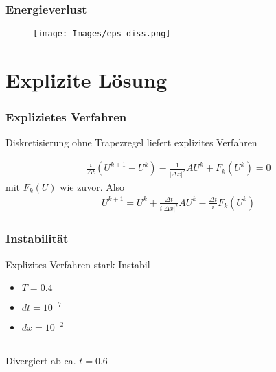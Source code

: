 \documentclass{beamer}
\begin{document}
\begin{frame}
    \frametitle{Energieverlust}

    \begin{figure}
        \begin{center}
            \texttt{[image: Images/eps-diss.png]}
        \end{center}
    \end{figure}

\end{frame}

\section{Explizite Lösung}

\begin{frame}
    \frametitle{Explizietes Verfahren}

    Diskretisierung ohne Trapezregel liefert explizites Verfahren

    \begin{align*}
        \frac{i}{\Delta t} (U^{k+1}-U^k)-\frac{1}{|\Delta x|^2}AU^k+F_k(U^k)=0
    \end{align*}
    mit $F_k(U)$ wie zuvor. Also
    \begin{align*}
        U^{k+1}=U^k+\frac{\Delta t}{i|\Delta x|^2}AU^k-\frac{\Delta t}{i}F_k(U^k)
    \end{align*}


\end{frame}

\begin{frame}
    \frametitle{Instabilität}

    Explizites Verfahren stark Instabil
    \begin{itemize}
        \item $T = 0.4$
        \item $dt = 10^{-7}$
        \item $dx = 10^{-2}$
    \end{itemize}
    \ \\
    Divergiert ab ca. $t=0.6$


\end{frame}
\end{document}

